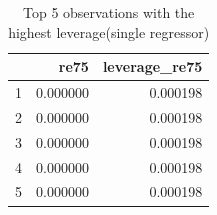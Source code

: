 \begin{table}[ht]
\centering
\begin{tabular}{rrr}
  \hline
 & re75 & leverage\_re75 \\ 
  \hline
1 & 0.000000 & 0.000198 \\ 
  2 & 0.000000 & 0.000198 \\ 
  3 & 0.000000 & 0.000198 \\ 
  4 & 0.000000 & 0.000198 \\ 
  5 & 0.000000 & 0.000198 \\ 
   \hline
\end{tabular}
\caption{Top 5 observations with the highest leverage(single regressor)} 
\label{tab:highest_leverage_re75}
\end{table}
